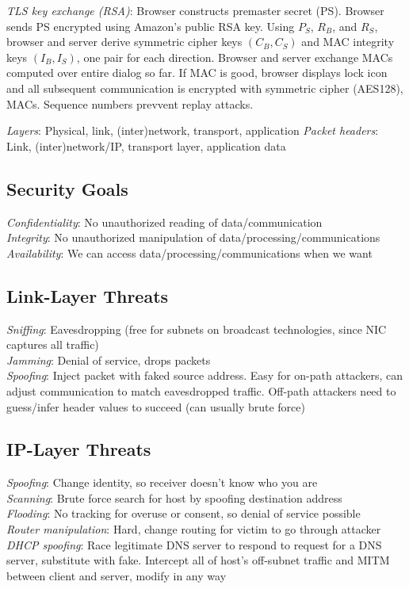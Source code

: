 \documentclass[10pt,landscape]{article}
\begin{document}
\begin{multicols}{3}
\textit{TLS key exchange (RSA)}: Browser constructs premaster secret (PS). Browser sends PS encrypted using Amazon's public RSA key. Using $P_S$, $R_B$, and $R_S$, browser and server derive symmetric cipher keys $(C_B, C_S)$ and MAC integrity keys $(I_B, I_S)$, one pair for each direction. Browser and server exchange MACs computed over entire dialog so far. If MAC is good, browser displays lock icon and all subsequent communication is encrypted with symmetric cipher (AES128), MACs. Sequence numbers prevvent replay attacks.

\textit{Layers}: Physical, link, (inter)network, transport, application
\textit{Packet headers}: Link, (inter)network/IP, transport layer, application data

\subsection{Security Goals}

\textit{Confidentiality}: No unauthorized reading of data/communication \\
\textit{Integrity}: No unauthorized manipulation of data/processing/communications \\
\textit{Availability}: We can access data/processing/communications when we want

\subsection{Link-Layer Threats}

\textit{Sniffing}: Eavesdropping (free for subnets on broadcast technologies, since NIC captures all traffic) \\
\textit{Jamming}: Denial of service, drops packets \\
\textit{Spoofing}: Inject packet with faked source address. Easy for on-path attackers, can adjust communication to match eavesdropped traffic. Off-path attackers need to guess/infer header values to succeed (can usually brute force)

\subsection{IP-Layer Threats}

\textit{Spoofing}: Change identity, so receiver doesn't know who you are \\
\textit{Scanning}: Brute force search for host by spoofing destination address \\
\textit{Flooding}: No tracking for overuse or consent, so denial of service possible \\
\textit{Router manipulation}: Hard, change routing for victim to go through attacker \\
\textit{DHCP spoofing}: Race legitimate DNS server to respond to request for a DNS server, substitute with fake. Intercept all of host's off-subnet traffic and MITM between client and server, modify in any way


\end{multicols}
\end{document}
